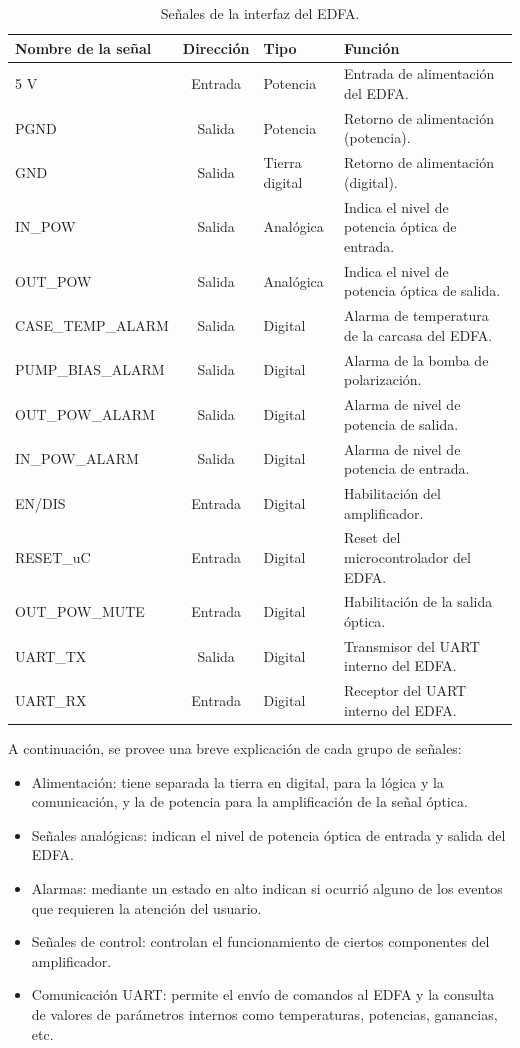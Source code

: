 \begin{table}[H]
	\centering
	\caption{Señales de la interfaz del EDFA.}
	\begin{tabular}{l c p{1.5cm} p{5cm}}
		\toprule
		\textbf{Nombre de la señal}	& \textbf{Dirección}	& \textbf{Tipo} & \textbf{Función} \\
		\midrule
		5 V 					& Entrada	& Potencia			& Entrada de alimentación del EDFA. \\		
		PGND				& Salida	& Potencia  		& Retorno de alimentación (potencia). \\
		GND					& Salida	& Tierra digital  	& Retorno de alimentación (digital). \\
		IN\_POW				& Salida	& Analógica 		& Indica el nivel de potencia óptica de entrada. \\
		OUT\_POW			& Salida	& Analógica 		& Indica el nivel de potencia óptica de salida. \\
		CASE\_TEMP\_ALARM	& Salida	& Digital 			& Alarma de temperatura de la carcasa del EDFA. \\
		PUMP\_BIAS\_ALARM	& Salida	& Digital 			& Alarma de la bomba de polarización. \\
		OUT\_POW\_ALARM		& Salida	& Digital 			& Alarma de nivel de potencia de salida. \\
		IN\_POW\_ALARM		& Salida	& Digital 			& Alarma de nivel de potencia de entrada. \\
		EN/DIS				& Entrada	& Digital 			& Habilitación del amplificador. \\
		RESET\_uC			& Entrada	& Digital 			& Reset del microcontrolador del EDFA. \\
		OUT\_POW\_MUTE		& Entrada	& Digital 			& Habilitación de la salida óptica. \\
		UART\_TX			& Salida	& Digital 			& Transmisor del UART interno del EDFA. \\
		UART\_RX			& Entrada	& Digital 			& Receptor del UART interno del EDFA. \\
		\bottomrule
		\hline
	\end{tabular}
	\label{tab:señalesConector}
\end{table}

A continuación, se provee una breve explicación de cada grupo de señales:
\begin{itemize}
\item Alimentación: tiene separada la tierra en digital, para la lógica y la comunicación, y la de potencia para la amplificación de la señal óptica.
\item Señales analógicas: indican el nivel de potencia óptica de entrada y salida del EDFA.
\item Alarmas: mediante un estado en alto indican si ocurrió alguno de los eventos que requieren la atención del usuario.
\item Señales de control: controlan el funcionamiento de ciertos componentes del amplificador.
\item Comunicación UART: permite el envío de comandos al EDFA y la consulta de valores de parámetros internos como temperaturas, potencias, ganancias, etc.
\end{itemize}

